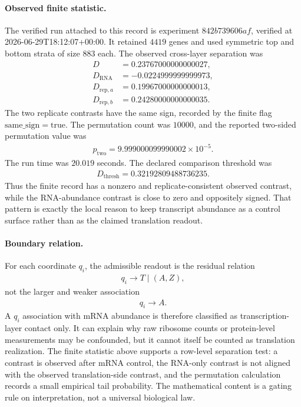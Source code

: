 \paragraph{Observed finite statistic.}
The verified run attached to this record is experiment $842b739606af$, verified at 2026-06-29T18:12:07+00:00. It retained $4419$ genes and used symmetric top and bottom strata of size $883$ each. The observed cross-layer separation was
$$
\begin{aligned}
  D &= 0.23767000000000027,\\
  D_{\mathrm{RNA}} &= -0.0224999999999973,\\
  D_{\mathrm{rep},a} &= 0.19967000000000013,\\
  D_{\mathrm{rep},b} &= 0.24280000000000035.
\end{aligned}
$$
The two replicate contrasts have the same sign, recorded by the finite flag $\mathrm{same\_sign}=\mathrm{true}$. The permutation count was $10000$, and the reported two-sided permutation value was
$$
\begin{aligned}
  p_{\mathrm{two}} = 9.999000099990002 \times 10^{-5}.
\end{aligned}
$$
The run time was $20.019$ seconds. The declared comparison threshold was
$$
\begin{aligned}
  D_{\mathrm{thresh}} = 0.32192809488736235.
\end{aligned}
$$
Thus the finite record has a nonzero and replicate-consistent observed contrast, while the RNA-abundance contrast is close to zero and oppositely signed. That pattern is exactly the local reason to keep transcript abundance as a control surface rather than as the claimed translation readout.

\paragraph{Boundary relation.}
For each coordinate $q_i$, the admissible readout is the residual relation
$$
\begin{aligned}
  q_i \longrightarrow T \mid (A, Z),
\end{aligned}
$$
not the larger and weaker association
$$
\begin{aligned}
  q_i \longrightarrow A.
\end{aligned}
$$
A $q_i$ association with mRNA abundance is therefore classified as transcription-layer contact only. It can explain why raw ribosome counts or protein-level measurements may be confounded, but it cannot itself be counted as translation realization. The finite statistic above supports a row-level separation test: a contrast is observed after mRNA control, the RNA-only contrast is not aligned with the observed translation-side contrast, and the permutation calculation records a small empirical tail probability. The mathematical content is a gating rule on interpretation, not a universal biological law.

